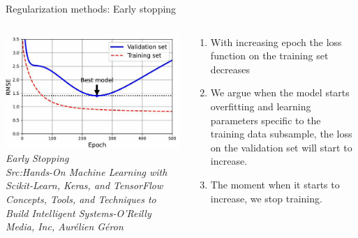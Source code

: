 \begin{frame}{Regularization methods: Early stopping}
	\begin{columns}[T]
        \begin{column}{0.4\textwidth}
        	\includegraphics[width=\textwidth]{images/early Stopping.png}
			\tiny{\textit{Early Stopping\\Src:Hands-On Machine Learning with Scikit-Learn, Keras, and TensorFlow  Concepts, Tools, and Techniques to Build Intelligent Systems-O'Reilly Media, Inc, Aurélien Géron }}
        \end{column}
		\begin{column}{0.6\textwidth}
			\begin{enumerate}[$\bullet$]
				\item With increasing epoch the loss function on the training set decreases\pause
				\item We argue when the model starts overfitting and learning parameters specific to the training data subsample, the loss on the validation set will start to increase. \pause
				\item The moment when it starts to increase, we stop training. 
			\end{enumerate}
		\end{column} 
    \end{columns}
\end{frame}

